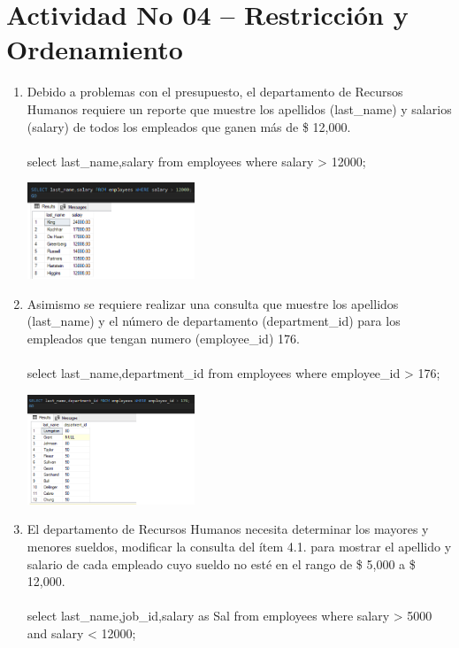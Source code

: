 \section{Actividad No 04 – Restricci\'on y Ordenamiento} 
		
\begin{enumerate}[1.]
	\item Debido a problemas con el presupuesto, el departamento de Recursos Humanos requiere un reporte que muestre los apellidos (last\_name) y salarios (salary) de todos los empleados que ganen más de \$ 12,000.
	\\ \\ select last\_name,salary from employees where salary > 12000;

	\begin{center}
	\includegraphics[width=5cm]{./Imagenes/actividad_04_01} 
	\end{center}

	\item Asimismo se requiere realizar una consulta que muestre los apellidos (last\_name) y el n\'umero de departamento (department\_id) para los empleados que tengan numero (employee\_id) 176.
	\\ \\select last\_name,department\_id from employees where employee\_id > 176;

	\begin{center}
	\includegraphics[width=5cm]{./Imagenes/actividad_04_02} 
	\end{center}

	\item El departamento de Recursos Humanos necesita determinar los mayores y menores sueldos, modificar la consulta del  ítem 4.1. para mostrar el apellido y salario de cada empleado cuyo sueldo no est\'e en el rango de \$ 5,000 a \$ 12,000.
	\\ \\select last\_name,job\_id,salary as Sal from employees where salary > 5000 and salary < 12000;


\end{enumerate}
